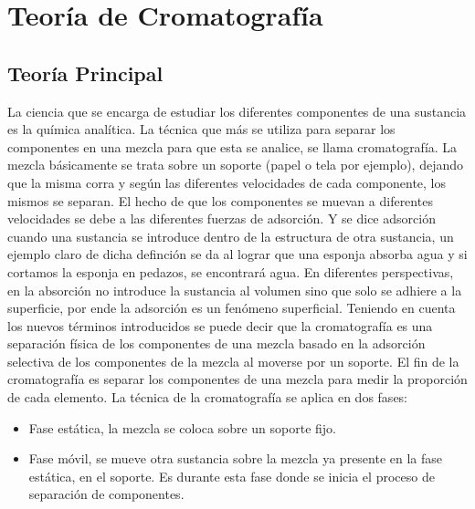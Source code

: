 \section{Teor\'ia de Cromatograf\'ia}

\subsection{Teor\'ia Principal}
La ciencia que se encarga de estudiar los diferentes componentes de una sustancia es la qu\'imica anal\'itica. La t\'ecnica que m\'as se utiliza para separar los componentes en una mezcla para que esta se analice, se llama cromatograf\'ia. La mezcla b\'asicamente se trata sobre un soporte (papel o tela por ejemplo), dejando que la misma corra y seg\'un las diferentes velocidades de cada componente, los mismos se separan. El hecho de que los componentes se muevan a diferentes velocidades se debe a las diferentes fuerzas de adsorci\'on. Y se dice adsorci\'on cuando una sustancia se introduce dentro de la estructura de otra sustancia, un ejemplo claro de dicha definci\'on se da al lograr que una esponja absorba agua y si cortamos la esponja en pedazos, se encontrar\'a agua. En diferentes perspectivas, en la absorci\'on no introduce  la sustancia al volumen sino que solo se adhiere a la superficie, por ende la adsorci\'on es un fen\'omeno superficial. 
Teniendo en cuenta los nuevos t\'erminos introducidos se puede decir que la cromatograf\'ia es una separaci\'on f\'isica de los componentes de una mezcla basado en la adsorci\'on selectiva de los componentes de la mezcla al moverse por un soporte. El fin de la cromatograf\'ia es separar los componentes de una mezcla para medir la proporci\'on de cada elemento. 
La t\'ecnica de la cromatograf\'ia se aplica en dos fases:
\begin{itemize}
	\item Fase est\'atica, la mezcla se coloca sobre un soporte fijo.
	\item Fase m\'ovil, se mueve otra sustancia sobre la mezcla ya presente en la fase est\'atica, en el soporte. Es durante esta fase donde se inicia el proceso de separaci\'on de componentes.
\end{itemize}

